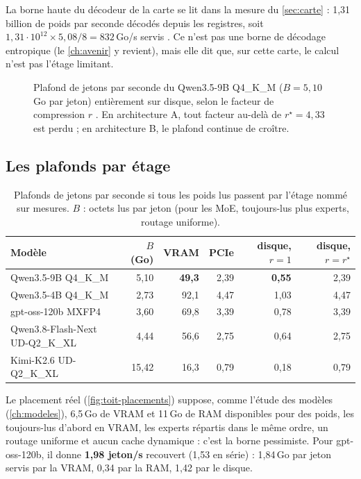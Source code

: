 La borne haute du décodeur de la carte se lit dans la mesure du \cref{sec:carte} : 1,31 billion de poids par seconde décodés depuis les registres, soit $1{,}31\cdot10^{12} \times 5{,}08/8 = 832$\,Go/s servis \calc. Ce n'est pas une borne de décodage entropique (le \cref{ch:avenir} y revient), mais elle dit que, sur cette carte, le calcul n'est pas l'étage limitant.

\begin{figure}[ht]
\centering
\GrapheToitR
\caption[Le toit du Qwen3.5-9B entièrement sur disque, selon $r$]{Plafond de jetons par seconde du Qwen3.5-9B Q4\_K\_M ($B = 5{,}10$\,Go par jeton) entièrement sur disque, selon le facteur de compression $r$ \calc. En architecture A, tout facteur au-delà de $r^\star = 4{,}33$ est perdu ; en architecture B, le plafond continue de croître.}
\label{fig:toit-r}
\end{figure}

\subsection{Les plafonds par étage}

\begin{table}[ht]
\centering\small
\caption[Plafonds de jetons/s par étage]{Plafonds de jetons par seconde si tous les poids lus passent par l'étage nommé \calc~sur mesures. $B$ : octets lus par jeton (pour les MoE, toujours-lus plus experts, routage uniforme).}
\label{tab:toit-modeles}
\begin{tabular}{@{}lrrrrr@{}}
\toprule
Modèle & $B$ (Go) & VRAM & PCIe & disque, $r=1$ & disque, $r=r^\star$ \\
\midrule
Qwen3.5-9B Q4\_K\_M & 5,10 & \textbf{49,3} & 2,39 & \textbf{0,55} & 2,39 \\
Qwen3.5-4B Q4\_K\_M & 2,73 & 92,1 & 4,47 & 1,03 & 4,47 \\
gpt-oss-120b MXFP4 & 3,60 & 69,8 & 3,39 & 0,78 & 3,39 \\
Qwen3.8-Flash-Next UD-Q2\_K\_XL & 4,44 & 56,6 & 2,75 & 0,64 & 2,75 \\
Kimi-K2.6 UD-Q2\_K\_XL & 15,42 & 16,3 & 0,79 & 0,18 & 0,79 \\
\bottomrule
\end{tabular}
\end{table}

Le placement réel (\cref{fig:toit-placements}) suppose, comme l'étude des modèles (\cref{ch:modeles}), 6,5\,Go de VRAM et 11\,Go de RAM disponibles pour des poids, les toujours-lus d'abord en VRAM, les experts répartis dans le même ordre, un routage uniforme et aucun cache dynamique : c'est la borne pessimiste. Pour gpt-oss-120b, il donne \textbf{1,98 jeton/s} recouvert (1,53 en série) : 1,84\,Go par jeton servis par la VRAM, 0,34 par la RAM, 1,42 par le disque.


